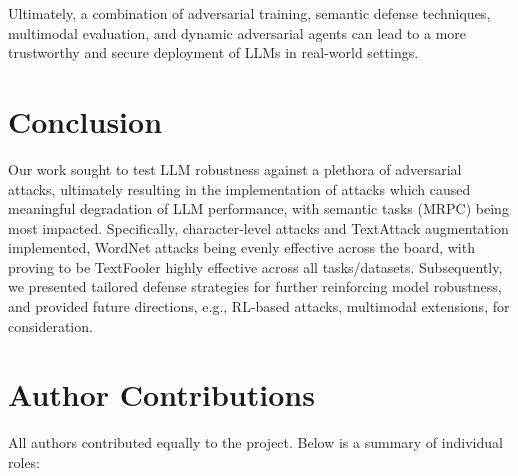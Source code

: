 \documentclass[conference]{IEEEtran}
\begin{document}
\bigskip
Ultimately, a combination of adversarial training, semantic defense techniques, multimodal evaluation, and dynamic adversarial agents can lead to a more trustworthy and secure deployment of LLMs in real-world settings.

\section{Conclusion}

Our work sought to test LLM robustness against a plethora of adversarial attacks, ultimately resulting in the implementation of attacks which caused meaningful degradation of LLM performance, with semantic tasks (MRPC) being most impacted. Specifically, character-level attacks and TextAttack augmentation implemented, WordNet attacks being evenly effective across the board, with proving to be TextFooler highly effective across all tasks/datasets. Subsequently, we presented tailored defense strategies for further reinforcing model robustness, and provided future directions, e.g., RL-based attacks, multimodal extensions, for consideration.


\section*{Author Contributions}

All authors contributed equally to the project. Below is a summary of individual roles:
\end{document}
